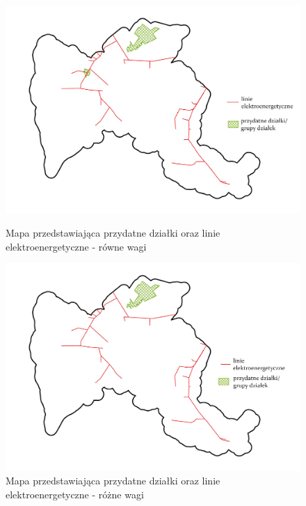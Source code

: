 \documentclass{article}
\begin{document}
\begin{figure}[H]
    \begin{minipage}[t]{0.48\textwidth}
        \centering
        \includegraphics[width=\linewidth]{img/dzialki-linie.jpg}
        \caption{Mapa przedstawiająca przydatne działki oraz linie elektroenergetyczne - równe wagi}
        \label{fig:dzialki-linie-rowne}
    \end{minipage}
    \hfill
    \begin{minipage}[t]{0.48\textwidth}
        \centering
        \includegraphics[width=\linewidth]{img/roznewagi-dzialki-linie.jpg}
        \caption{Mapa przedstawiająca przydatne działki oraz linie elektroenergetyczne - różne wagi}
        \label{fig:dzialki-linie-rozne}
    \end{minipage}
\end{figure}
\vspace{10pt}
\end{document}
